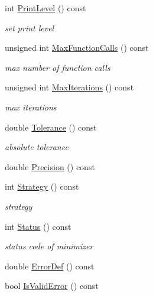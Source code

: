 \begin{DoxyCompactItemize}
\item 
int \mbox{\hyperlink{classROOT_1_1Math_1_1Minimizer_ae6c76dc2f3073f19edf22561866c2f9c}{Print\+Level}} () const
\begin{DoxyCompactList}\small\item\em set print level \end{DoxyCompactList}\item 
unsigned int \mbox{\hyperlink{classROOT_1_1Math_1_1Minimizer_a0d7f60c2e5b240258d32feed547b30a3}{Max\+Function\+Calls}} () const
\begin{DoxyCompactList}\small\item\em max number of function calls \end{DoxyCompactList}\item 
unsigned int \mbox{\hyperlink{classROOT_1_1Math_1_1Minimizer_a472e2b4a5d108a378f6905d67c680afc}{Max\+Iterations}} () const
\begin{DoxyCompactList}\small\item\em max iterations \end{DoxyCompactList}\item 
double \mbox{\hyperlink{classROOT_1_1Math_1_1Minimizer_a038755fd3252d054a3bec59f3f008621}{Tolerance}} () const
\begin{DoxyCompactList}\small\item\em absolute tolerance \end{DoxyCompactList}\item 
double \mbox{\hyperlink{classROOT_1_1Math_1_1Minimizer_a10c2c6ff21d1946c61639678435bbf4b}{Precision}} () const
\item 
int \mbox{\hyperlink{classROOT_1_1Math_1_1Minimizer_a7b2a1a1947d6cc627f4753424b77f881}{Strategy}} () const
\begin{DoxyCompactList}\small\item\em strategy \end{DoxyCompactList}\item 
int \mbox{\hyperlink{classROOT_1_1Math_1_1Minimizer_a634833b3a6e525ef10605de5fd051499}{Status}} () const
\begin{DoxyCompactList}\small\item\em status code of minimizer \end{DoxyCompactList}\item 
double \mbox{\hyperlink{classROOT_1_1Math_1_1Minimizer_aa4e46f31bb8dfb770fcb704e585a3593}{Error\+Def}} () const
\item 
bool \mbox{\hyperlink{classROOT_1_1Math_1_1Minimizer_aac4dfcda9c3eb7e672d450c0e78c61bf}{Is\+Valid\+Error}} () const

\end{DoxyCompactItemize}
